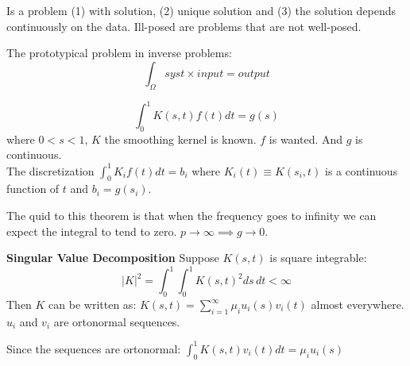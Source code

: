 \begin{ddef}
Is a problem (1) with solution, (2) unique solution and (3) the solution depends continuously on the data. Ill-posed are problems that are not well-posed.
\end{ddef}

\begin{remarks}
The prototypical problem in inverse problems:
    $$\int_\Omega syst \times input = output$$
\end{remarks}

\begin{ddef}
$$\int_0^1 K(s,t) f(t) dt = g(s) $$  
where $0<s<1$, $K$ the smoothing kernel is known. $f$ is wanted. And $g$ is continuous.\\
The discretization $\int_0^1 K_i f(t) dt =b_i$ where $K_i(t) \equiv K(s_i,t)$ is a continuous function of $t$ and $b_i=g(s_i)$. 
\end{ddef}  

\begin{teorema}
The quid to this theorem is that when the frequency goes to infinity we can expect the integral to tend to zero. $p\to \infty \implies g\to 0$.
\end{teorema}

\begin{ddef}
\textbf{Singular Value Decomposition}
Suppose $K(s,t)$ is square integrable: $$ |K|^2 = \int_0^1 \int_0^1 K(s,t)^2 ds\, dt<\infty$$ 
Then $K$ can be written as: $K(s,t)=\sum_{i=1}^\infty \mu_i u_i(s)v_i(t)$ almost everywhere. $u_i$ and $v_i$ are ortonormal sequences.
\end{ddef}

\begin{ddef}
Since the sequences are ortonormal: $\int_0^1 K(s,t)v_i(t) dt = \mu_i u_i(s)$
\end{ddef}
